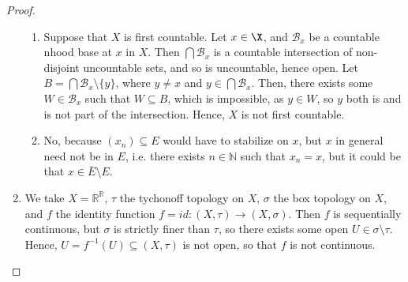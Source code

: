 \documentclass[12pt]{extarticle}
\newcommand{\set}[1]{\{#1\}}
\newcommand{\R}{\mathbb{R}}
\newcommand{\N}{\mathbb{N}}
\newcommand{\<}{\langle}
\renewcommand{\>}{\rangle}
\theoremstyle{definition}
\begin{document}
\begin{proof}
\begin{enumerate}
\begin{enumerate}
    \item
      Suppose that $X$ is first countable. Let $x \in \X$, and $\mathcal{B}_x$ be a countable nhood base at $x$ in $X$.
      Then $\bigcap \mathcal{B}_x$ is a countable intersection of non-disjoint uncountable sets, and so is uncountable, hence open.
      Let $B = \bigcap \mathcal{B}_x \setminus \set{y}$, where $y \neq x$ and $y \in \bigcap \mathcal{B}_x$. Then, there exists some $W \in \mathcal{B}_x$
      such that $W \subseteq B$, which is impossible, as $y \in W$, so $y$ both is and is not part of the intersection.
      Hence, $X$ is not first countable.
    \item
      No, because $(x_n) \subseteq E$ would have to stabilize on $x$, but $x$ in general need not be in $E$, i.e. there exists $n \in \N$ such that $x_n=x$, but it could be that $x \in \overline{E} \setminus E$.

    \end{enumerate}
  \item
    We take $X = \R^{\R}$, $\tau$ the tychonoff topology on $X$, $\sigma$ the box topology on $X$, and $f$ the identity function $f = id: (X, \tau) \to (X, \sigma)$. Then $f$ is sequentially continuous, but $\sigma$ is strictly
    finer than $\tau$, so there exists some open $U \in \sigma \setminus \tau$. Hence, $U = f^{-1}(U) \subseteq (X, \tau)$ is not open, so that $f$ is not continuous. 


    

  \end{enumerate}
\end{proof}
\end{document}
